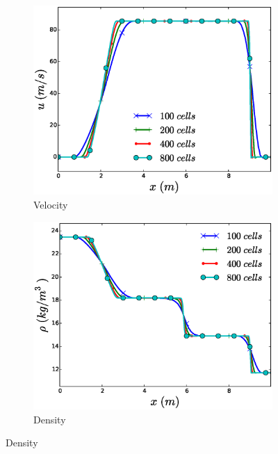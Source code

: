 \documentclass{inputs/mc2015}
\begin{document}
\begin{figure}[H]
        \centering
        \begin{subfigure}[b]{0.5\textwidth}
                \centering
                \includegraphics[width=\textwidth]{figures/air-shock-tube-velocity-plot.eps}
                \caption{Velocity}
                \label{fig:air-tube-plots-vel}
        \end{subfigure}%
        \begin{subfigure}[b]{0.5\textwidth}
                \centering
                \includegraphics[width=\textwidth]{figures/air-shock-tube-density-plot.eps}
                \caption{Density}
                \label{fig:air-tube-plots-dens}
        \end{subfigure}
        

\end{figure}
\end{document}
